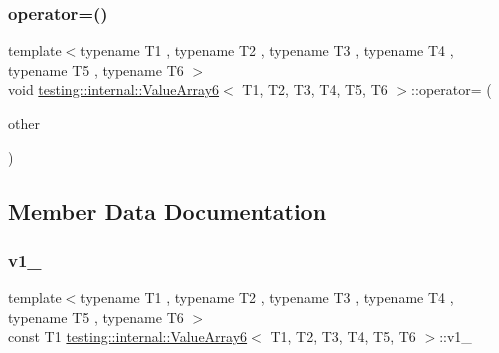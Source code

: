 \mbox{\label{classtesting_1_1internal_1_1_value_array6_a4f242827b4ceb40049f6584bb6cbbe28}} 
\subsubsection{\texorpdfstring{operator=()}{operator=()}}
{\footnotesize\ttfamily template$<$typename T1 , typename T2 , typename T3 , typename T4 , typename T5 , typename T6 $>$ \\
void \mbox{\hyperlink{classtesting_1_1internal_1_1_value_array6}{testing\+::internal\+::\+Value\+Array6}}$<$ T1, T2, T3, T4, T5, T6 $>$\+::operator= (\begin{DoxyParamCaption}\item[{const \mbox{\hyperlink{classtesting_1_1internal_1_1_value_array6}{Value\+Array6}}$<$ T1, T2, T3, T4, T5, T6 $>$ \&}]{other }\end{DoxyParamCaption})\hspace{0.3cm}{\ttfamily [private]}}



\subsection{Member Data Documentation}
\mbox{\label{classtesting_1_1internal_1_1_value_array6_a9c36c0865cd8d803cf0af29679095c3b}} 
\subsubsection{\texorpdfstring{v1\_}{v1\_}}
{\footnotesize\ttfamily template$<$typename T1 , typename T2 , typename T3 , typename T4 , typename T5 , typename T6 $>$ \\
const T1 \mbox{\hyperlink{classtesting_1_1internal_1_1_value_array6}{testing\+::internal\+::\+Value\+Array6}}$<$ T1, T2, T3, T4, T5, T6 $>$\+::v1\+\_\+\hspace{0.3cm}{\ttfamily [private]}}

